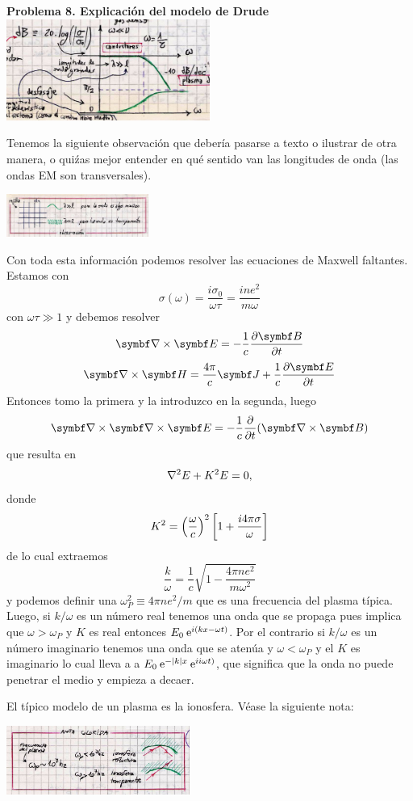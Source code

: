 \documentclass[10pt,oneside]{CBFT_book}
\begin{document}
\begin{ejemplo}{\bf Problema 8. Explicación del modelo de Drude}
\includegraphics[width=0.5\textwidth]{images/fig_ft1_problema8C.jpg} 

Tenemos la siguiente observación que debería pasarse a texto o ilustrar de otra manera, o quiźas
mejor entender en qué sentido van las longitudes de onda (las ondas EM son transversales).

\includegraphics[width=0.35\textwidth]{images/fig_ft1_problema8F.jpg} 

Con toda esta información podemos resolver las ecuaciones de Maxwell faltantes.
Estamos con
\[
	\sigma(\omega) = \frac{i \sigma_0}{\omega \tau} = \frac{ i n e^2}{ m \omega }
\]
con $\omega \tau \gg 1$ y debemos resolver
\[
	\rotorm{E} = - \frac{1}{c} \dpar{\vb{B}}{t}
\]
\[
	\rotorm{H} = \frac{4\pi}{c}\vb{J} + \frac{1}{c} \dpar{\vb{E}}{t}
\]
Entonces tomo la primera y la introduzco en la segunda, luego
\[
	\Nabla\times\Nabla\times\vb{E} = - \frac{1}{c}\dpar{}{t}(\rotorm{B})
\]
que resulta en
\[
	\nabla^2{E} + K^2 E = 0,
\]
donde
\[
	K^2 = \left( \frac{ \omega }{ c } \right)^2 \left[ 1 + \frac{i 4 \pi \sigma}{\omega}\right]
\]
de lo cual extraemos
\[
	\frac{k}{\omega} = \frac{1}{c} \sqrt{ 1 - \frac{4\pi n e^2}{m \omega^2} }
\]
y podemos definir una $\omega_P^2 \equiv 4\pi n e^2 / m$ que es una frecuencia del plasma típica.
Luego, si $k/\omega$ es un número real tenemos una onda que se propaga pues implica que
$\omega > \omega_P $ y $K$ es real entonces $E_0 \:\mathrm{e}^{i (kx-\omega t)}$.
Por el contrario si $k/\omega$ es un número imaginario tenemos una onda que se atenúa y 
$ \omega < \omega_P $ y el $K$ es imaginario lo cual lleva a a $E_0 \:\mathrm{e}^{-|k|x}\:\mathrm{e}^{i i\omega t)}$,
que significa que la onda no puede penetrar el medio y empieza a decaer.

El típico modelo de un plasma es la ionosfera. Véase la siguiente nota:

\includegraphics[width=0.45\textwidth]{images/fig_ft1_problema8D.jpg} 


\end{ejemplo}
\end{document}
